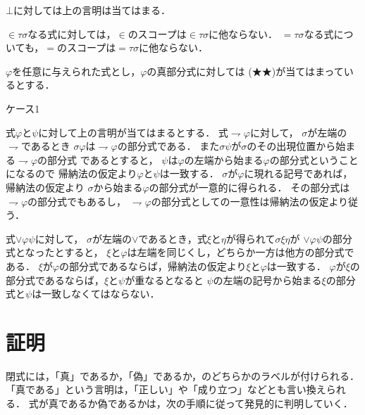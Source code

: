 \documentclass[a4j,10.5pt,oneside,openany]{jsbook}
\theoremstyle{mystyle}
\begin{document}
	$\bot$に対しては上の言明は当てはまる．
	
	$\in \tau \sigma$なる式に対しては，$\in$のスコープは$\in \tau \sigma$に他ならない．
	$= \tau \sigma$なる式についても，$=$のスコープは$= \tau \sigma$に他ならない．
	
	$\varphi$を任意に与えられた式とし，$\varphi$の真部分式に対しては
	(★★)が当てはまっているとする．
	
	\begin{description}
		\item[ケース1] 
	\end{description}
	式$\varphi$と$\psi$に対して上の言明が当てはまるとする．
	式$\rightharpoondown \varphi$に対して，
	$\sigma$が左端の$\rightharpoondown$であるとき
	$\sigma \varphi$は$\rightharpoondown \varphi$の部分式である．
	また$\sigma \psi$が$\sigma$のその出現位置から始まる$\rightharpoondown \varphi$の部分式
	であるとすると，
	$\psi$は$\varphi$の左端から始まる$\varphi$の部分式ということになるので
	帰納法の仮定より$\varphi$と$\psi$は一致する．
	$\sigma$が$\varphi$に現れる記号であれば，帰納法の仮定より
	$\sigma$から始まる$\varphi$の部分式が一意的に得られる．
	その部分式は$\rightharpoondown \varphi$の部分式でもあるし，
	$\rightharpoondown \varphi$の部分式としての一意性は帰納法の仮定より従う．
	
	式$\vee \varphi \psi$に対して，
	$\sigma$が左端の$\vee$であるとき，式$\xi$と$\eta$が得られて$\sigma \xi \eta$が
	$\vee \varphi \psi$の部分式となったとすると，
	$\xi$と$\varphi$は左端を同じくし，どちらか一方は他方の部分式である．
	$\xi$が$\varphi$の部分式であるならば，帰納法の仮定より$\xi$と$\varphi$は一致する．
	$\varphi$が$\xi$の部分式であるならば，$\xi$と$\psi$が重なるとなると
	$\psi$の左端の記号から始まる$\xi$の部分式と$\psi$は一致しなくてはならない．
	
\section{証明}
	閉式には，「真」であるか，「偽」であるか，のどちらかのラベルが付けられる．
	「真である」という言明は，「正しい」や「成り立つ」などとも言い換えられる．
	式が真であるか偽であるかは，次の手順に従って発見的に判明していく．
	
\end{document}
